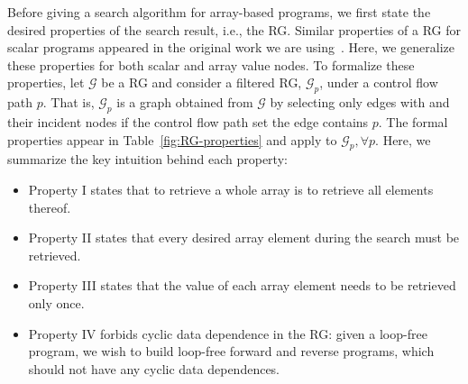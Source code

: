 Before giving a search algorithm for array-based programs, we first state the desired properties of the search result, i.e., the RG.
%
Similar properties of a RG for scalar programs appeared in the original work we are using~\cite{Hou2012}.
Here, we generalize these properties for both scalar and array value nodes.
To formalize these properties, let $\mathcal{G}$ be a RG and consider a filtered RG, $\mathcal{G}_p$, under a control flow path $p$.
That is, $\mathcal{G}_p$ is a graph obtained from $\mathcal{G}$ by selecting only edges with and their incident nodes if the control flow path set the edge contains $p$.
The formal properties appear in Table~\ref{fig:RG-properties} and apply to $\mathcal{G}_p,\forall p$.
%
Here, we summarize the key intuition behind each property:
%
\begin{itemize}
\item Property I states that to retrieve a whole array is to retrieve all elements thereof.
\item Property II states that every desired array element during the search must be retrieved. 
\item Property III states that the value of each array element needs to be retrieved only once.
\item Property IV forbids cyclic data dependence in the RG: given a loop-free program, we wish to build loop-free forward and reverse programs, which should not have any cyclic data dependences.
\end{itemize}

